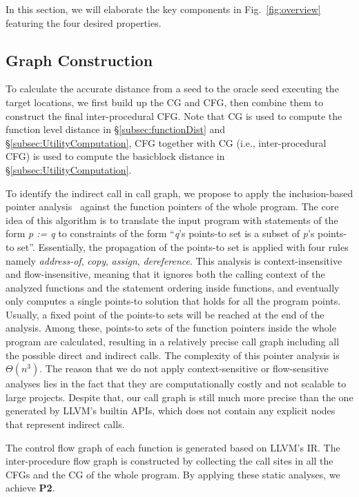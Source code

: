 In this section, we will elaborate the key components in Fig.~\ref{fig:overview} featuring the four desired properties.


\subsection{Graph Construction} \label{subsec:graghCons}

To calculate the accurate distance from a seed to the oracle seed executing the target locations, we first build up the CG and CFG, then combine them to construct the final inter-procedural CFG. Note that CG is used to compute the function level distance in \S\ref{subsec:functionDist} and \S\ref{subsec:UtilityComputation}, CFG together with CG (i.e., inter-procedural CFG) is used to compute the basicblock distance in \S\ref{subsec:UtilityComputation}.




To identify the indirect call in call graph, we propose to apply the inclusion-based pointer analysis~\cite{Andersen94programanalysis} against the function pointers of the whole program. The core idea of this algorithm is to translate the input program with statements of the form \emph{p := q} to constraints of the form ``\emph{q}'s points-to set is a subset of \emph{p}'s points-to set''. 
Essentially, the propagation of the points-to set is applied with four rules namely \emph{address-of}, \emph{copy}, \emph{assign}, \emph{dereference}. This analysis is context-insensitive and flow-insensitive, meaning that it ignores both the calling context of the analyzed functions and the statement ordering inside functions, and eventually only computes a single points-to solution that holds for all the program points. Usually, a fixed point of the points-to sets will be reached at the end of the analysis. Among these, points-to sets of the function pointers inside the whole program are calculated, resulting in a relatively precise call graph including all the possible direct and indirect calls. The complexity of this pointer analysis is $\Theta(n^3)$.
The reason that we do not apply context-sensitive or flow-sensitive analyses lies in the fact that they are computationally costly and not scalable to large projects. Despite that, our call graph is still much more precise than the one generated by LLVM's builtin APIs, which does not contain any explicit nodes that represent indirect calls. 

The control flow graph of each function is generated based on LLVM's IR. The inter-procedure flow graph is constructed by collecting the call sites in all the CFGs and the CG of the whole program.  By applying these static analyses, we achieve \textbf{P2}.




